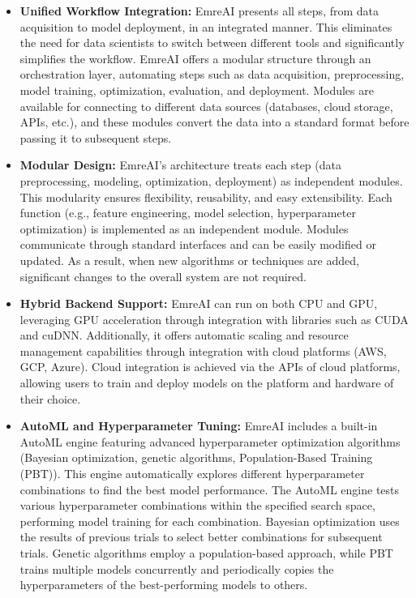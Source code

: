 \documentclass[conference]{IEEEtran}
\begin{document}
\begin{itemize}
    \item \textbf{Unified Workflow Integration:} EmreAI presents all steps, from data acquisition to model deployment, in an integrated manner. This eliminates the need for data scientists to switch between different tools and significantly simplifies the workflow. EmreAI offers a modular structure through an orchestration layer, automating steps such as data acquisition, preprocessing, model training, optimization, evaluation, and deployment. Modules are available for connecting to different data sources (databases, cloud storage, APIs, etc.), and these modules convert the data into a standard format before passing it to subsequent steps.

    \item \textbf{Modular Design:} EmreAI's architecture treats each step (data preprocessing, modeling, optimization, deployment) as independent modules. This modularity ensures flexibility, reusability, and easy extensibility. Each function (e.g., feature engineering, model selection, hyperparameter optimization) is implemented as an independent module. Modules communicate through standard interfaces and can be easily modified or updated. As a result, when new algorithms or techniques are added, significant changes to the overall system are not required.

    \item \textbf{Hybrid Backend Support:} EmreAI can run on both CPU and GPU, leveraging GPU acceleration through integration with libraries such as CUDA and cuDNN. Additionally, it offers automatic scaling and resource management capabilities through integration with cloud platforms (AWS, GCP, Azure). Cloud integration is achieved via the APIs of cloud platforms, allowing users to train and deploy models on the platform and hardware of their choice.

    \item \textbf{AutoML and Hyperparameter Tuning:} EmreAI includes a built-in AutoML engine featuring advanced hyperparameter optimization algorithms (Bayesian optimization, genetic algorithms, Population-Based Training (PBT)). This engine automatically explores different hyperparameter combinations to find the best model performance. The AutoML engine tests various hyperparameter combinations within the specified search space, performing model training for each combination. Bayesian optimization uses the results of previous trials to select better combinations for subsequent trials. Genetic algorithms employ a population-based approach, while PBT trains multiple models concurrently and periodically copies the hyperparameters of the best-performing models to others.


\end{itemize}
\end{document}
